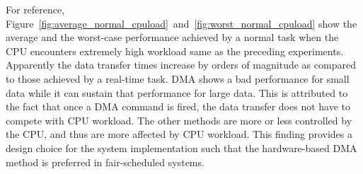 For reference,
Figure~\ref{fig:average_normal_cpuload}~and~\ref{fig:worst_normal_cpuload}
show the average and the worst-case performance achieved by a normal
task when the CPU encounters extremely high workload same as the
preceding experiments.
Apparently the data transfer times increase by orders of magnitude as
compared to those achieved by a real-time task.
\textsf{DMA} shows a bad performance for small data while it can sustain
that performance for large data.
This is attributed to the fact that once a DMA command is fired, the
data transfer does not have to compete with CPU workload.
The other methods are more or less controlled by the CPU, and thus are
more affected by CPU workload.
This finding provides a design choice for the system implementation such
that the hardware-based DMA method is preferred in fair-scheduled systems.

